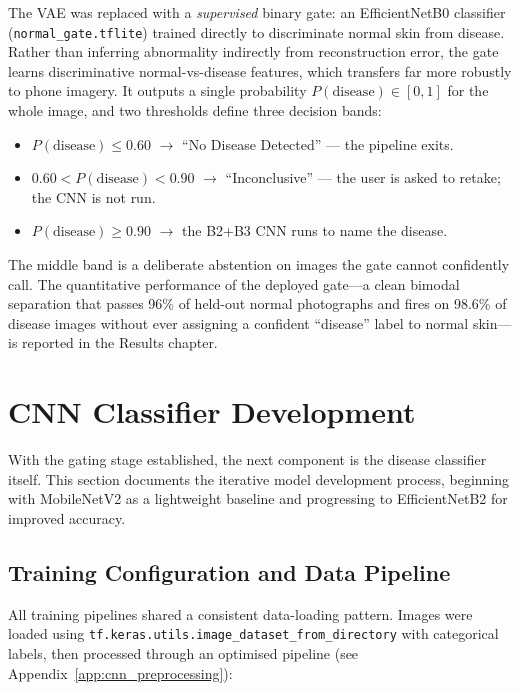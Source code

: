 The VAE was replaced with a \emph{supervised} binary gate: an EfficientNetB0
classifier (\texttt{normal\_gate.tflite}) trained directly to discriminate normal
skin from disease. Rather than inferring abnormality indirectly from
reconstruction error, the gate learns discriminative normal-vs-disease features,
which transfers far more robustly to phone imagery. It outputs a single
probability $P(\text{disease}) \in [0,1]$ for the whole image, and two thresholds
define three decision bands:

\begin{itemize}
    \item $P(\text{disease}) \le 0.60$ $\rightarrow$ ``No Disease Detected'' --- the pipeline exits.
    \item $0.60 < P(\text{disease}) < 0.90$ $\rightarrow$ ``Inconclusive'' --- the user is asked to retake; the CNN is not run.
    \item $P(\text{disease}) \ge 0.90$ $\rightarrow$ the B2+B3 CNN runs to name the disease.
\end{itemize}

\noindent The middle band is a deliberate abstention on images the gate cannot
confidently call. The quantitative performance of the deployed gate---a clean
bimodal separation that passes 96\% of held-out normal photographs and fires on
98.6\% of disease images without ever assigning a confident ``disease'' label to
normal skin---is reported in the Results chapter.


\section{CNN Classifier Development}
\label{sec:cnn}

With the gating stage established, the next component is the disease classifier itself. This section documents the iterative model development process, beginning with MobileNetV2 as a lightweight baseline and progressing to EfficientNetB2 for improved accuracy.

\subsection{Training Configuration and Data Pipeline}
\label{sec:training_config}

All training pipelines shared a consistent data-loading pattern. Images were loaded using \texttt{tf.keras.utils.image\_dataset\_from\_directory} with categorical labels, then processed through an optimised pipeline (see Appendix~\ref{app:cnn_preprocessing}):

